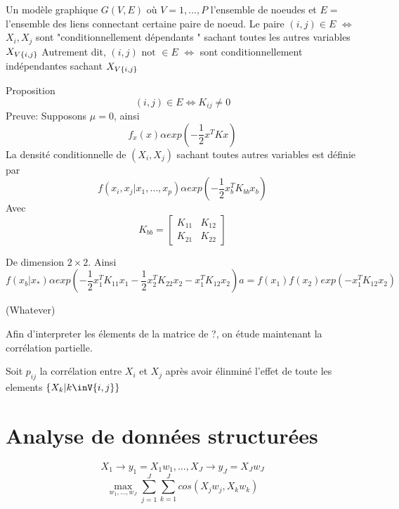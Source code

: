 \documentclass{article}
\begin{document}
Un mod\`ele graphique $G(V,E)$ o\`u $V={1,\ldots,P}$ l'ensemble de noeudes et $E=$ l'ensemble des liens connectant certaine paire de noeud. Le paire $(i,j)\in E$ $\Leftrightarrow$ $X_i,X_j$ sont "conditionnellement d\'ependants " sachant toutes les autres variables $X_{V\\ \{i,j\}}$
Autrement dit, $(i,j) \text{ not }\in E$ $\Leftrightarrow$ sont conditionnellement ind\'ependantes sachant $X_{V\\ \{i,j\}}$

Proposition
\begin{equation}
(i,j) \in E \Leftrightarrow K_{ij}\neq 0
\end{equation}
Preuve: Supposons $\mu=0$, ainsi
\begin{equation}
f_x(x)\alpha exp(-\frac{1}{2}x^TKx)
\end{equation}
La densit\'e conditionnelle de $(X_i,X_j)$ sachant toutes autres variables est d\'efinie par
\begin{equation}
f(x_i,x_j|x_1,\dots,x_p)\alpha exp(-\frac{1}{2}x_b^TK_{bb}x_b)
\end{equation}
Avec
\begin{equation}
K_{bb}=\begin{bmatrix}
K_{11} & K_{12}\\
K_{21} & K_{22}
\end{bmatrix}
\end{equation}

De dimension $2\times2$.
Ainsi
\begin{equation}
f(x_b|x_*)\alpha exp(-\frac{1}{2}x_1^TK_{11}x_1-\frac{1}{2}x_2^TK_{22}x_2-x_1^TK_{12}x_2)a=f(x_1)f(x_2)exp(-x_1^TK_{12}x_2)
\end{equation}

(Whatever)

Afin d'interpreter les \'elements de la matrice de ?, on \'etude maintenant la corr\'elation partielle.

Soit $p_{ij}$ la corr\'elation entre $X_i$ et $X_j$ apr\`es avoir \'elinmin\'e l'effet de toute les elements $\{X_k|k\inV\\ \{i,j\}\}$

\section{Analyse de donn\'ees structur\'ees}

\begin{equation}
X_1\to y_1=X_1w_1,\ldots,X_J\to y_J=X_Jw_J
\end{equation}
\begin{equation}
\max_{w_1,\ldots,w_J}\sum_{j=1}^J\sum_{k=1}^J cos(X_jw_j, X_kw_k)
\end{equation}
\end{document}
